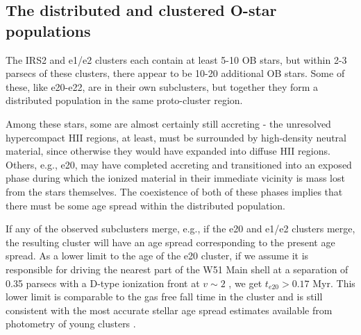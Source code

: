 
\subsection{The distributed and clustered O-star populations}
The IRS2 and e1/e2 clusters each contain at least 5-10 OB stars, but within 2-3
parsecs of these clusters, there appear to be 10-20 additional OB stars.  Some
of these, like e20-e22, are in their own subclusters, but together they form a
distributed population in the same proto-cluster region.

Among these stars, some are almost certainly still accreting - the unresolved
hypercompact HII regions, at least, must be surrounded by high-density neutral
material, since otherwise they would have expanded into diffuse HII regions.
Others, e.g., e20, may have completed accreting and transitioned into an
exposed phase during which the ionized material in their immediate vicinity is
mass lost from the stars themselves.  The coexistence of both of these phases
implies that there must be some age spread within the distributed population.


If any of the observed subclusters merge, e.g., if the e20 and e1/e2 clusters
merge, the resulting cluster will have an age spread corresponding to the present
age spread.  As a lower limit to the age of the e20 cluster, if we assume it is
responsible for driving the nearest part of the W51 Main shell at a separation
of 0.35 parsecs with a D-type ionization front at $v\sim2$ \kms, we get
$t_{e20} > 0.17$ Myr.  This lower limit is comparable to the gas free fall
time in the cluster and is still consistent with the most accurate stellar age
spread estimates available from photometry of young clusters
\citep[e.g.,][]{Kudryavtseva2012a}.


